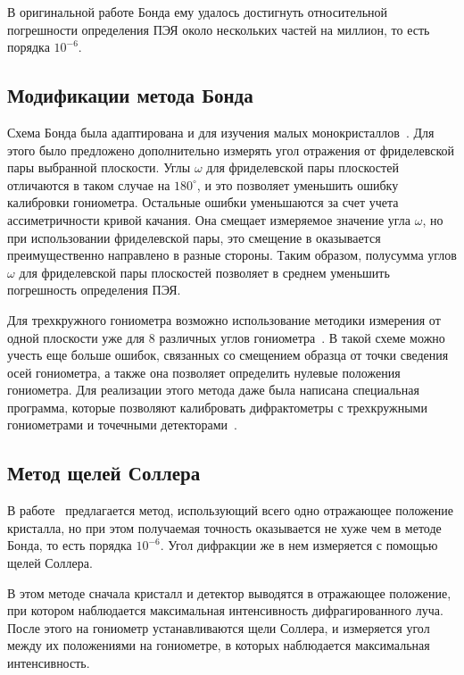 \documentclass[a4paper,14pt]{extarticle}
\newcommand{\degree}{^\circ}
\begin{document}
В оригинальной работе Бонда ему удалось достигнуть относительной погрешности определения ПЭЯ около нескольких частей на миллион, то есть порядка $10^{-6}$.

\subsection{Модификации метода Бонда}

Схема Бонда была адаптирована и для изучения малых монокристаллов~\cite{Hubbard:1976,Ponomarev:1969}.
Для этого было предложено дополнительно измерять угол отражения от фриделевской пары выбранной плоскости.
Углы $\omega$ для фриделевской пары плоскостей отличаются в таком случае на $180\degree$, и это позволяет уменьшить ошибку калибровки гониометра.
Остальные ошибки уменьшаются за счет учета ассиметричности кривой качания.
Она смещает измеряемое значение угла $\omega$, но при использовании фриделевской пары, это смещение в оказывается преимущественно направлено в разные стороны.
Таким образом, полусумма углов $\omega$ для фриделевской пары плоскостей позволяет в среднем уменьшить погрешность определения ПЭЯ.

Для трехкружного гониометра возможно использование методики измерения от одной плоскости уже для 8 различных углов гониометра~\cite{King:1979}.
В такой схеме можно учесть еще больше ошибок, связанных со смещением образца от точки сведения осей гониометра, а также она позволяет определить нулевые положения гониометра.
Для реализации этого метода даже была написана специальная программа, которые позволяют калибровать дифрактометры с трехкружными гониометрами и точечными детекторами~\cite{Angel:2011}.

\subsection{Метод щелей Соллера}

В работе~\cite{Berger:1984} предлагается метод, использующий всего одно отражающее положение кристалла, но при этом получаемая точность оказывается не хуже чем в методе Бонда, то есть порядка $10^{-6}$.
Угол дифракции же в нем измеряется с помощью щелей Соллера.

В этом методе сначала кристалл и детектор выводятся в отражающее положение, при котором наблюдается максимальная интенсивность дифрагированного луча.
После этого на гониометр устанавливаются щели Соллера, и измеряется угол между их положениями на гониометре, в которых наблюдается максимальная интенсивность.
\end{document}
